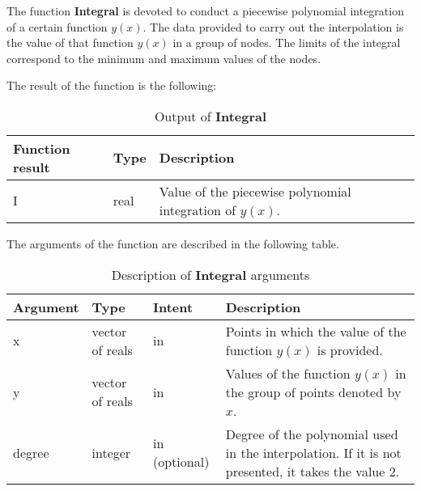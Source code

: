 The function \textbf{Integral} is devoted to conduct a piecewise polynomial integration of a certain function $y(x)$. The data provided to carry out the interpolation is the value of that function $y(x)$ in a group of nodes. The limits of the integral correspond to the minimum and maximum values of the nodes.


The result of the function is the following:

\begin{table}[H]
	\begin{center}
		\begin{spacing}{1.2}
			\begin{tabular}{| l | l | p{6cm} |}
				
				\hline
				
				\bf Function result & \bf Type & \bf Description \\ \hline \hline
				
				I & real & Value of the piecewise polynomial integration of $y(x)$.\\ \hline
				
			\end{tabular}
		\end{spacing}
	\end{center}
	\caption{Output of \textbf{Integral}}
\end{table}



The arguments of the function are described in the following table.


\begin{table}[H]
	\begin{center}
		\begin{spacing}{1.2}
			\begin{tabular}{| l | l | l | p{6cm} |}
				
				\hline
				
				\bf Argument & \bf Type & \bf Intent & \bf Description \\ \hline \hline
				
				x & vector of reals & in & Points in which the value of the function $y(x)$ is provided.\\ \hline
				
				y & vector of reals & in & Values of the function $y(x)$ in the group of points denoted by $x$. \\ \hline
				
				degree & integer & in (optional) & Degree of the polynomial used in the interpolation. If it is not presented, it takes the value 2. \\ \hline
				
			\end{tabular}
		\end{spacing}
	\end{center}
	\caption{Description of \textbf{Integral} arguments}
\end{table}





